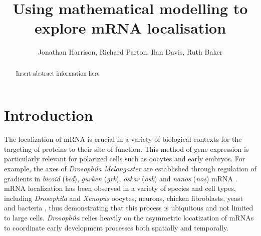 \documentclass[twocolumn]{biophys}
\begin{document}
\setcounter{page}{1} %

\title{Using mathematical modelling to explore mRNA localisation}

\author{Jonathan Harrison, Richard Parton, Ilan Davis, Ruth Baker}

\address{University of Oxford}





\begin{abstract}%
{Insert abstract information here}%
{}
{}
\end{abstract}

\maketitle %

\section{Introduction}

The localization of mRNA is crucial in a variety of biological contexts for the targeting of proteins to their site of function.
This method of gene expression is particularly relevant for polarized cells such as oocytes and early embryos.
For example, the axes of \textit{Drosophila Melongaster} are established through regulation of gradients in \textit{bicoid} (\textit{bcd}), \textit{gurken} (\textit{grk}), \textit{oskar} (\textit{osk}) and \textit{nanos} (\textit{nos}) mRNA \citep{wolpert1998}.
mRNA localization has been observed in a variety of species and cell types, including \textit{Drosophila} and \textit{Xenopus} oocytes, neurons, chicken fibroblasts, yeast and bacteria \citep{wilkie2001drosophila, bobola1996asymmetric, mowry1992vegetal, rosbash1993rna, nevo2011translation}, thus demonstrating that this process is ubiquitous and not limited to large cells. 
\textit{Drosophila} relies heavily on the asymmetric locatization of mRNAs to coordinate early development processes both spatially and temporally.
\end{document}
